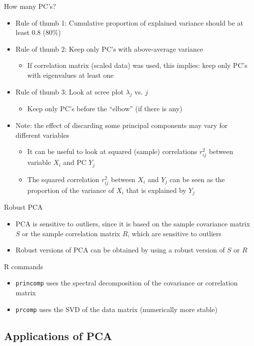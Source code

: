 \documentclass[a4paper]{article}
\begin{document}
How many PC's?
\begin{itemize}
    \item Rule of thumb 1: Cumulative proportion of explained variance should be at least 0.8 (80\%)
    \item Rule of thumb 2: Keep only PC's with above-average variance
    \begin{itemize}
        \item If correlation matrix (scaled data) was used, this implies: keep only PC's with eigenvalues at least one
    \end{itemize}
    \item Rule of thumb 3: Look at scree plot $\lambda_j$ vs. $j$
    \begin{itemize}
        \item Keep only PC's before the ``elbow'' (if there is any)
    \end{itemize}
    \item Note: the effect of discarding some principal components may vary for different variables
    \begin{itemize}
        \item It can be useful to look at squared (sample) correlations $r_{ij}^2$ between variable $X_i$ and PC $Y_j$
        \item The squared correlation $r_{ij}^2$ between $X_i$ and $Y_j$ can be seen as the proportion of the variance of $X_i$ that is explained by $Y_j$
    \end{itemize}
\end{itemize}

Robust PCA
\begin{itemize}
    \item PCA is sensitive to outliers, since it is based on the sample covariance matrix $S$ or the sample correlation matrix $R$, which are sensitive to outliers
    \item Robust versions of PCA can be obtained by using a robust version of $S$ or $R$
\end{itemize}

R commands
\begin{itemize}
    \item \texttt{princomp} uses the spectral decomposition of the covariance or correlation matrix
    \item \texttt{prcomp} uses the SVD of the data matrix (numerically more stable)
\end{itemize}

\subsection{Applications of PCA}
\end{document}
